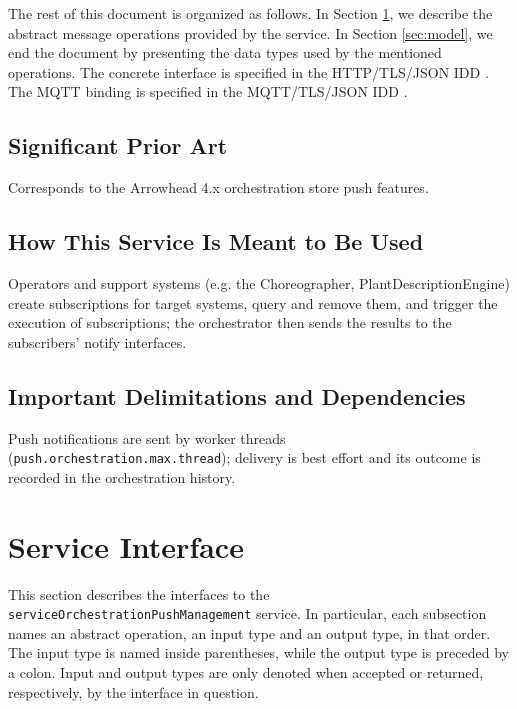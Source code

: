 \documentclass[a4paper]{arrowhead}
\begin{document}
The rest of this document is organized as follows.
In Section \ref{sec:operations}, we describe the abstract message operations provided by the service.
In Section \ref{sec:model}, we end the document by presenting the data types used by the mentioned operations.
The concrete interface is specified in the HTTP/TLS/JSON IDD \cite{dso-serviceOrchestrationPushManagement-http-idd}. The MQTT binding is specified in the MQTT/TLS/JSON IDD \cite{dso-serviceOrchestrationPushManagement-mqtt-idd}.

\subsection{Significant Prior Art}

Corresponds to the Arrowhead 4.x orchestration store push features.

\subsection{How This Service Is Meant to Be Used}

Operators and support systems (e.g. the Choreographer, Plant\allowbreak{}Description\allowbreak{}Engine) create subscriptions for target systems, query and remove them, and trigger the execution of subscriptions; the orchestrator then sends the results to the subscribers' notify interfaces.

\subsection{Important Delimitations and Dependencies}
\label{sec:delimitations}

Push notifications are sent by worker threads (\texttt{push.\allowbreak{}orchestration.\allowbreak{}max.\allowbreak{}thread}); delivery is best effort and its outcome is recorded in the orchestration history.

\newpage

\section{Service Interface}
\label{sec:operations}

This section describes the interfaces to the \texttt{service\allowbreak{}Orchestration\allowbreak{}Push\allowbreak{}Management} service.
In particular, each subsection names an abstract operation, an input type and an output type, in that order.
The input type is named inside parentheses, while the output type is preceded by a colon.
Input and output types are only denoted when accepted or returned, respectively, by the interface in question.
\end{document}
